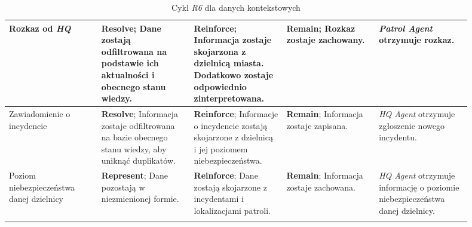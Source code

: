 \begin{landscape}
\begin{longtable}{|p{0.18\linewidth}|p{0.18\linewidth}|p{0.18\linewidth}|p{0.18\linewidth}|p{0.18\linewidth}|}
     \hline
     Rozkaz od \emph{HQ}  & \textbf{Resolve}; Dane zostają odfiltrowana na podstawie ich aktualności i obecnego stanu wiedzy. & \textbf{Reinforce}; Informacja zostaje skojarzona z dzielnicą miasta. Dodatkowo zostaje odpowiednio zinterpretowana. & \textbf{Remain}; Rozkaz zostaje zachowany. & \emph{Patrol Agent} otrzymuje rozkaz. \\
     \hline
     Zawiadomienie o incydencie  & \textbf{Resolve}; Informacja zostaje odfiltrowana na bazie obecnego stanu wiedzy, aby uniknąć duplikatów. & \textbf{Reinforce}; Informacje o incydencie zostają skojarzone z dzielnicą i jej poziomem niebezpieczeństwa. & \textbf{Remain}; Informacja zostaje zapisana. & \emph{HQ Agent} otrzymuje zgłoszenie nowego incydentu. \\
     \hline
      Poziom niebezpieczeństwa danej dzielnicy &  \textbf{Represent}; Dane pozostają w niezmienionej formie. & \textbf{Reinforce}; Dane zostają skojarzone z incydentami i lokalizacjami patroli. & \textbf{Remain}; Informacja zostaje zachowana. & \emph{HQ Agent} otrzymuje informację o poziomie niebezpieczeństwa danej dzielnicy. \\
      \hline
    \caption{Cykl \emph{R6} dla danych kontekstowych}
    \label{tab:r6CycleForContextData}
    \end{longtable}
\end{landscape}


